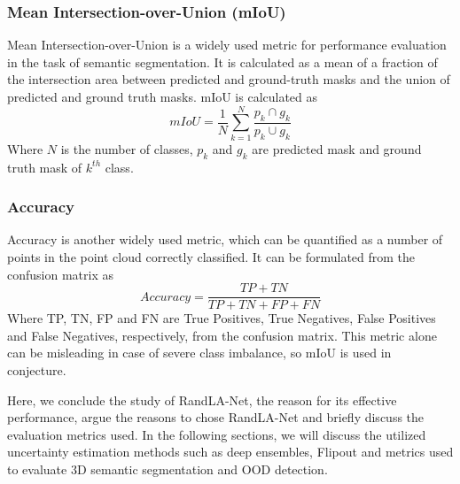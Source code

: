 \subsubsection{Mean Intersection-over-Union (mIoU)}
Mean Intersection-over-Union is a widely used metric for performance evaluation in the task of semantic segmentation.
It is calculated as a mean of a fraction of the intersection area between predicted and ground-truth masks and the union of predicted and ground truth masks.
mIoU is calculated as
$$mIoU=\frac{1}{N}\sum_{k=1}^N \frac{p_k\cap g_k}{p_k \cup g_k}$$
Where $N$ is the number of classes, $p_k$ and $g_k$ are predicted mask and ground truth mask of $k^{th}$ class.

\subsubsection{Accuracy}
Accuracy is another widely used metric, which can be quantified as a number of points in the point cloud correctly classified.
It can be formulated from the confusion matrix as
$$Accuracy = \frac{TP+TN}{TP+TN+FP+FN}$$
Where TP, TN, FP and FN are True Positives, True Negatives, False Positives and False Negatives, respectively, from the confusion matrix.
This metric alone can be misleading in case of severe class imbalance, so mIoU is used in conjecture.

Here, we conclude the study of RandLA-Net, the reason for its effective performance, argue the reasons to chose RandLA-Net and briefly discuss the evaluation metrics used.
In the following sections, we will discuss the utilized uncertainty estimation methods such as deep ensembles, Flipout and metrics used to evaluate 3D semantic segmentation and OOD detection.
